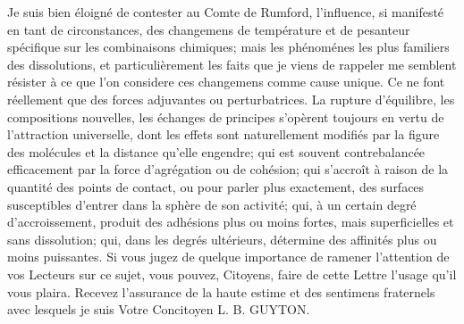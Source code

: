 Je suis bien éloigné de contester au Comte de Rumford, l'influence, si manifesté en tant de circonstances, des changemens de température et de pesanteur spécifique sur les combinaisons chimiques; mais les phénoménes les plus familiers des dissolutions, et particulièrement les faits que je viens de rappeler me\setcounter{page}{96} semblent résister à ce que l'on considere ces changemens comme cause unique. Ce ne font réellement que des forces adjuvantes ou perturbatrices. La rupture d'équilibre, les compositions nouvelles, les échanges de principes s'opèrent toujours en vertu de l'attraction universelle, dont les effets sont naturellement modifiés par la figure des molécules et la distance qu'elle engendre; qui est souvent contrebalancée efficacement par la force d'agrégation ou de cohésion; qui s'accroît à raison de la quantité des points de contact, ou pour parler plus exactement, des surfaces susceptibles d'entrer dans la sphère de son activité; qui, à un certain degré d'accroissement, produit des adhésions plus ou moins fortes, mais superficielles et sans dissolution; qui, dans les degrés ultérieurs, détermine des affinités plus ou moins puissantes.
Si vous jugez de quelque importance de ramener l'attention de vos Lecteurs sur ce sujet, vous pouvez, Citoyens, faire de cette Lettre l'usage qu'il vous plaira.
Recevez l'assurance de la haute estime et des sentimens fraternels avec lesquels je suis
Votre Concitoyen
L. B. GUYTON.